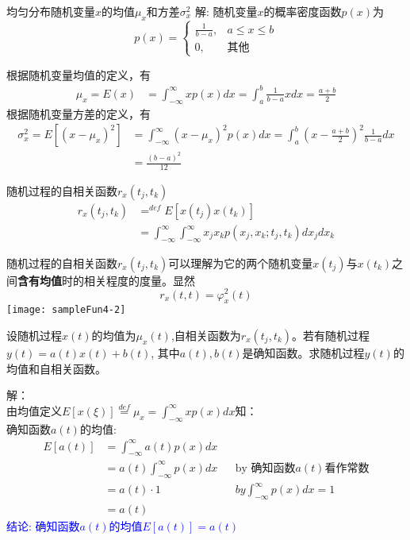 \begin{frame}{均匀分布随机变量$x$的均值$\mu_x$和方差$\sigma_x^2$}
解: 随机变量$x$的概率密度函数$p(x)$为
\[p(x)=\begin{cases}
\frac{1}{b-a}, &a\le x\le b\\
0, &\text{其他}
\end{cases} \]

根据随机变量均值的定义，有
\begin{align*}
\mu_x=E(x)&=\int_{-\infty}^{\infty}xp(x)dx=\int_{a}^{b}\frac{1}{b-a}xdx =\frac{a+b}{2}
\end{align*}
根据随机变量方差的定义，有
\begin{align*}
\sigma_x^2=E[(x-\mu_x)^2]&=\int_{-\infty}^{\infty}(x-\mu_x)^2p(x)dx=\int_{a}^{b}\left(x-\frac{a+b}{2}\right)^2\frac{1}{b-a}dx \\
&=\frac{(b-a)^2}{12}
\end{align*}	
\end{frame}

\begin{frame}
\begin{block}{随机过程的自相关函数$r_x(t_j,t_k)$}
\begin{align*}
r_x(t_j,t_k)&\mathop{=}^{def}E[x(t_j)x(t_k)]\\
&=\int_{-\infty}^{\infty}	\int_{-\infty}^{\infty}x_jx_kp(x_j,x_k;t_j,t_k)dx_jdx_k
\end{align*}
\end{block}
随机过程的自相关函数$r_x(t_j,t_k)$可以理解为它的两个随机变量$x(t_j)$与$x(t_k)$之间\textbf{含有均值}时的相关程度的度量。显然
\[r_x(t,t)=\varphi_x^2(t)\]
\texttt{[image: sampleFun4-2]}
\end{frame}

\begin{frame}
\begin{example}
	设随机过程$x(t)$的均值为$\mu_x(t)$,自相关函数为$r_x(t_j,t_k)$。若有随机过程$y(t)=a(t)x(t)+b(t)$, 其中$a(t),b(t)$是确知函数。求随机过程$y(t)$的均值和自相关函数。
\end{example}
\end{frame}

\begin{frame}
解：\\
由均值定义$E[x(\xi)]\mathop{=}\limits^{def}\mu_x=\int_{-\infty}^{\infty}xp(x)dx$知：\\
确知函数$a(t)$的均值:
\begin{align*}
E[a(t)]&=\int_{-\infty}^{\infty}a(t)p(x)dx\\
&=a(t)\int_{-\infty}^{\infty}p(x)dx &&\text{by 确知函数$a(t)$看作常数}\\
&=a(t)\cdot 1 &&by \int_{-\infty}^{\infty}p(x)dx=1\\
&=a(t)
\end{align*}
\textcolor{blue}{结论: 确知函数$a(t)$的均值$E[a(t)]=a(t)$}
\end{frame}

